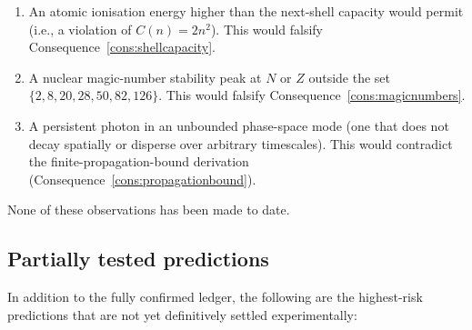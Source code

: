 \begin{enumerate}[leftmargin=2em]
  \item An atomic ionisation energy higher than the next-shell capacity would
    permit (i.e., a violation of $C(n)=2n^{2}$).  This would falsify
    Consequence~\ref{cons:shellcapacity}.

  \item A nuclear magic-number stability peak at $N$ or $Z$ outside the set
    $\{2,8,20,28,50,82,126\}$.  This would falsify
    Consequence~\ref{cons:magicnumbers}.

  \item A persistent photon in an unbounded phase-space mode (one that does
    not decay spatially or disperse over arbitrary timescales).  This would
    contradict the finite-propagation-bound derivation
    (Consequence~\ref{cons:propagationbound}).
\end{enumerate}

None of these observations has been made to date.

\subsection*{Partially tested predictions}

In addition to the fully confirmed ledger, the following are the
highest-risk predictions that are not yet definitively settled
experimentally:

